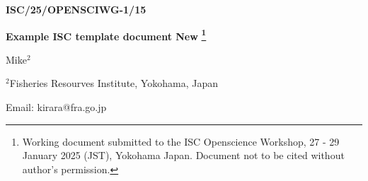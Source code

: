 \thispagestyle{empty}
\begin{flushright}
    \textbf{ISC/25/OPENSCIWG-1/15}
\end{flushright}
\vspace{1in}

\begin{center}
    \textbf{Example ISC template document New}
    \textbf{\footnote{Working document submitted to the ISC Openscience Workshop, 27 - 29 January 2025
    (JST), Yokohama Japan. Document not to be cited without author’s permission.}}
    
    \vspace{0.25in}
    Mike\begin{math}^2\end{math} %

    \vspace{0.25in}
    \begin{math}^2\end{math}Fisheries Resourves Institute, Yokohama, Japan

    \vspace{0.25in}
    Email: kirara@fra.go.jp
\end{center}

\begin{figure}[!hb]
    \begin{center}
    \end{center}
\end{figure}

\clearpage

